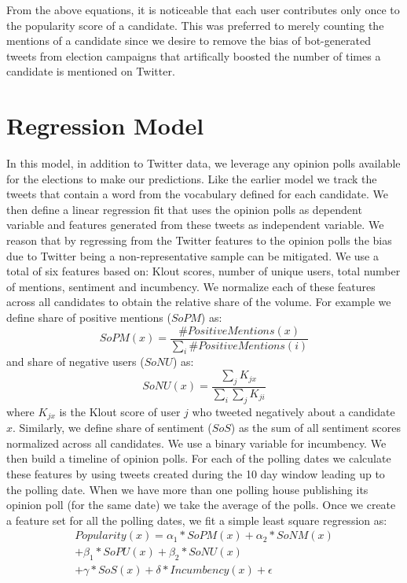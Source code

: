From the above equations, it is noticeable that each user contributes only once to the popularity score of a candidate.
This was preferred to merely counting the mentions of a candidate since we desire to remove the bias of 
bot-generated tweets from election campaigns that artifically
boosted the number of times a candidate is mentioned on Twitter.

\section{Regression Model}
In this model, in addition to Twitter data, we leverage any opinion polls available for the elections 
to make our predictions.
Like the earlier model we track the tweets that contain a word from the vocabulary defined for each candidate.
We then define a linear regression fit that uses the opinion polls as dependent variable and features generated from these tweets as independent variable.
We reason that by regressing from the Twitter features to the opinion polls the bias due to Twitter being a non-representative sample
can be mitigated.
We use a total of six features based on: Klout scores, number of unique users, total number of mentions, sentiment and incumbency.
We normalize each of these features across all candidates to obtain the relative share of the volume. 
For example we define share of positive mentions ($SoPM$)  as: 
\begin{equation}
SoPM(x) = \frac{\#PositiveMentions(x)}{\sum_i \#PositiveMentions(i)} 
\end{equation}
and share of negative users ($SoNU$) as:
\begin{equation}
SoNU(x) = \frac{\sum_j K_{jx}}{\sum_i \sum_j K_{ji}}
\end{equation}
where $K_{jx}$ is the Klout score of user $j$ who tweeted negatively about a candidate $x$.
Similarly, we define share of sentiment ($SoS$) as the sum of all sentiment scores normalized across all candidates. 
We use a binary variable for incumbency. 
We then build a timeline of opinion polls. 
For each of the polling dates we calculate these features by using tweets created during the 10 day window 
leading up to the polling date.
When we have more than one polling house publishing its opinion poll (for the same date) we take the average of the polls. 
Once we create a feature set for all the polling dates, we fit a simple least square regression as:
\begin{equation}
\begin{split}
Popularity(x) = \alpha_1 * SoPM(x) + \alpha_2 * SoNM(x) \\
						 + \beta_1 * SoPU(x) + \beta_2 * SoNU(x) \\
						 + \gamma * SoS(x) + \delta * Incumbency(x) + \epsilon
\end{split}
\end{equation}

